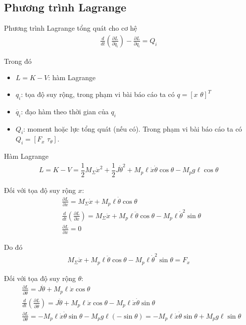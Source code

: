     \subsection*{Phương trình Lagrange}
            Phương trình Lagrange tổng quát cho cơ hệ
            \begin{align}
                \frac{d}{dt} \left( \frac{\partial L}{\partial \dot{q_i}} \right) - \frac{\partial L}{\partial q_i} = Q_i
            \end{align}

            Trong đó
            \begin{itemize}
                \item $L = K - V$: hàm Lagrange
                \item $q_i$: tọa độ suy rộng, trong phạm vi bài báo cáo ta có $q = [x \,\, \theta]^T$
                \item $\dot{q_i}$: đạo hàm theo thời gian của $q_i$
                \item $Q_i$: moment hoặc lực tổng quát (nếu có). Trong phạm vi bài báo cáo ta có $Q_i = [F_x \,\, \tau_\theta]$.
            \end{itemize}

            Hàm Lagrange
            \begin{align}
                L = K - V = \dfrac{1}{2} M_{\Sigma} \dot{x}^2 + \dfrac{1}{2} J \dot{\theta}^2 + M_p \ell \dot{x} \dot{\theta} \cos \theta - M_p g \ell \cos \theta 
            \end{align}    

            Đối với tọa độ suy rộng $x$:
            \begin{align*}
                &\frac{\partial L}{\partial \dot{x}} = M_{\Sigma} \dot{x} + M_p \ell \dot{\theta} \cos \theta\\
                &\frac{d}{dt} \left( \frac{\partial L}{\partial \dot{x}} \right) = M_{\Sigma} \ddot{x} + M_p \ell \ddot{\theta} \cos \theta - M_p \ell \dot{\theta}^2 \sin \theta\\
                &\frac{\partial L}{\partial x} = 0
            \end{align*}

            Do đó
            \begin{align}
                M_{\Sigma} \ddot{x} + M_p \ell \ddot{\theta} \cos \theta - M_p \ell \dot{\theta}^2 \sin \theta = F_x
            \end{align}


            Đối với tọa độ suy rộng $\theta$:
            \begin{align*}
                &\frac{\partial L}{\partial \dot{\theta}} = J \dot{\theta} + M_p \ell \dot{x} \cos \theta\\
                &\frac{d}{dt} \left( \frac{\partial L}{\partial \dot{\theta}} \right) = J \ddot{\theta} + M_p \ell \ddot{x} \cos \theta - M_p \ell \dot{x} \dot{\theta} \sin \theta\\
                &\frac{\partial L}{\partial \theta} = -M_p \ell \dot{x} \dot{\theta} \sin \theta - M_p g \ell (-\sin \theta) = -M_p \ell \dot{x} \dot{\theta} \sin \theta + M_p g \ell \sin \theta
            \end{align*}

